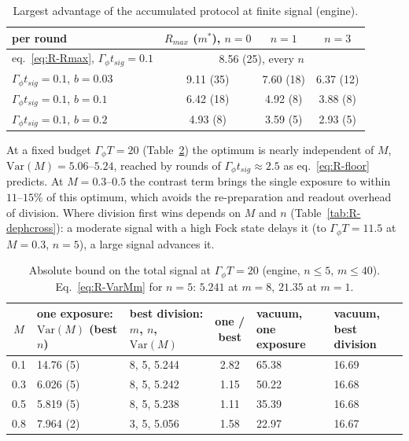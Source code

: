 \begin{table}[h]
\centering
\begin{tabular}{l c c c}
\hline
per round & $R_{max}$ ($m^*$), $n = 0$ & $n = 1$ & $n = 3$ \\
\hline
eq.~\eqref{eq:R-Rmax}, $\Gamma_\phi t_{sig} = 0.1$ & \multicolumn{3}{c}{8.56 (25), every $n$} \\
$\Gamma_\phi t_{sig} = 0.1$, $b = 0.03$ & 9.11 (35) & 7.60 (18) & 6.37 (12) \\
$\Gamma_\phi t_{sig} = 0.1$, $b = 0.1$ & 6.42 (18) & 4.92 (8) & 3.88 (8) \\
$\Gamma_\phi t_{sig} = 0.1$, $b = 0.2$ & 4.93 (8) & 3.59 (5) & 2.93 (5) \\
\hline
\end{tabular}
\caption{Largest advantage of the accumulated protocol at finite signal (engine).}
\label{tab:R-finite}
\end{table}

At a fixed budget $\Gamma_\phi T = 20$ (Table~\ref{tab:R-budget}) the optimum is nearly independent of $M$, $\mathrm{Var}(M) = 5.06$--$5.24$, reached by rounds of $\Gamma_\phi t_{sig} \approx 2.5$ as eq.~\eqref{eq:R-floor} predicts. At $M = 0.3$--$0.5$ the contrast term brings the single exposure to within $11$--$15\%$ of this optimum, which avoids the re-preparation and readout overhead of division. Where division first wins depends on $M$ and $n$ (Table~\ref{tab:R-dephcross}): a moderate signal with a high Fock state delays it (to $\Gamma_\phi T = 11.5$ at $M = 0.3$, $n = 5$), a large signal advances it.

\begin{table}[h]
\centering
\begin{tabular}{c p{2.6cm} p{2.6cm} c p{2.0cm} p{2.0cm}}
\hline
$M$ & one exposure: $\mathrm{Var}(M)$ (best $n$) & best division: $m$, $n$, $\mathrm{Var}(M)$ & one / best & vacuum, one exposure & vacuum, best division \\
\hline
0.1 & 14.76 (5) & 8, 5, 5.244 & 2.82 & 65.38 & 16.69 \\
0.3 & 6.026 (5) & 8, 5, 5.242 & 1.15 & 50.22 & 16.68 \\
0.5 & 5.819 (5) & 8, 5, 5.238 & 1.11 & 35.39 & 16.68 \\
0.8 & 7.964 (2) & 3, 5, 5.056 & 1.58 & 22.97 & 16.67 \\
\hline
\end{tabular}
\caption{Absolute bound on the total signal at $\Gamma_\phi T = 20$ (engine, $n \le 5$, $m \le 40$). Eq.~\eqref{eq:R-VarMm} for $n = 5$: $5.241$ at $m = 8$, $21.35$ at $m = 1$.}
\label{tab:R-budget}
\end{table}

